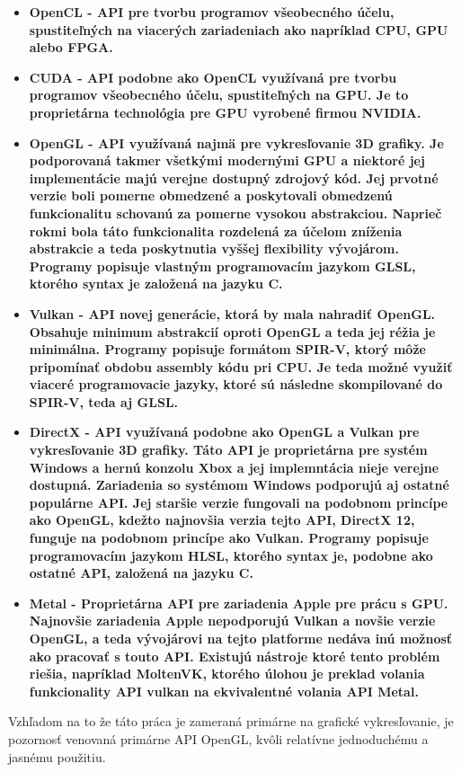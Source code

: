 \begin{itemize}
  \item{\bf OpenCL \rm - API pre tvorbu programov všeobecného účelu, spustiteľných na viacerých zariadeniach ako napríklad CPU, GPU alebo FPGA.}
  \item{\bf CUDA \rm - API podobne ako OpenCL využívaná pre tvorbu programov všeobecného účelu, spustiteľných na GPU. Je to proprietárna technológia pre GPU vyrobené firmou NVIDIA.}
  \item{\bf OpenGL \rm - API využívaná najmä pre vykresľovanie 3D grafiky. Je podporovaná takmer všetkými modernými GPU a niektoré jej implementácie majú verejne dostupný zdrojový kód. Jej prvotné verzie boli pomerne obmedzené a poskytovali obmedzenú funkcionalitu schovanú za pomerne vysokou abstrakciou. Naprieč rokmi bola táto funkcionalita rozdelená za účelom zníženia abstrakcie a teda poskytnutia vyššej flexibility vývojárom. Programy popisuje vlastným programovacím jazykom GLSL, ktorého syntax je založená na jazyku C.}
  \item{\bf Vulkan \rm - API novej generácie, ktorá by mala nahradiť OpenGL. Obsahuje minimum abstrakcií oproti OpenGL a teda jej réžia je minimálna. Programy popisuje formátom SPIR-V, ktorý môže pripomínať obdobu assembly kódu pri CPU. Je teda možné využiť viaceré programovacie jazyky, ktoré sú následne skompilované do SPIR-V, teda aj GLSL.}
  \item{\bf DirectX \rm - API využívaná podobne ako OpenGL a Vulkan pre vykresľovanie 3D grafiky. Táto API je proprietárna pre systém Windows a hernú konzolu Xbox a jej implemntácia nieje verejne dostupná. Zariadenia so systémom Windows podporujú aj ostatné populárne API. Jej staršie verzie fungovali na podobnom princípe ako OpenGL, kdežto najnovšia verzia tejto API, DirectX 12, funguje na podobnom princípe ako Vulkan. Programy popisuje programovacím jazykom HLSL, ktorého syntax je, podobne ako ostatné API, založená na jazyku C.}
  \item{\bf Metal \rm - Proprietárna API pre zariadenia Apple pre prácu s GPU. Najnovšie zariadenia Apple nepodporujú Vulkan a novšie verzie OpenGL, a teda vývojárovi na tejto platforme nedáva inú možnosť ako pracovať s touto API. Existujú nástroje ktoré tento problém riešia, napríklad MoltenVK, ktorého úlohou je preklad volania funkcionality API vulkan na ekvivalentné volania API Metal.}
\end{itemize}

Vzhľadom na to že táto práca je zameraná primárne na grafické vykresľovanie, je pozornosť venovaná primárne API OpenGL, kvôli relatívne jednoduchému a jasnému použitiu.

